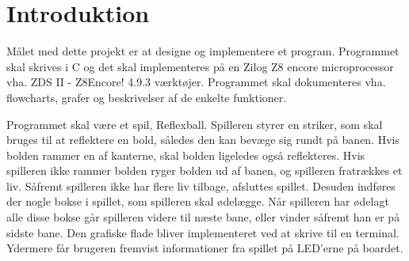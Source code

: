 \section{Introduktion}
Målet med dette projekt er at designe og implementere et program. Programmet skal skrives i C og det skal implementeres på en Zilog Z8 encore microprocessor vha. ZDS II - Z8Encore! 4.9.3 værktøjer. Programmet skal dokumenteres vha. flowcharts, grafer og beskrivelser af de enkelte funktioner.


Programmet skal være et spil, Reflexball. Spilleren styrer en striker, som skal bruges til at reflektere en bold, således den kan bevæge sig rundt på banen. Hvis bolden rammer en af kanterne, skal bolden ligeledes også reflekteres. Hvis spilleren ikke rammer bolden ryger bolden ud af banen, og spilleren fratrækkes et liv. Såfremt spilleren ikke har flere liv tilbage, afsluttes spillet. Desuden indføres der nogle bokse i spillet, som spilleren skal ødelægge. Når spilleren har ødelagt alle disse bokse går spilleren videre til næste bane, eller vinder såfremt han er på sidste bane. Den grafiske flade bliver implementeret ved at skrive til en terminal. Ydermere får brugeren fremvist informationer fra spillet på LED'erne på boardet.





 
